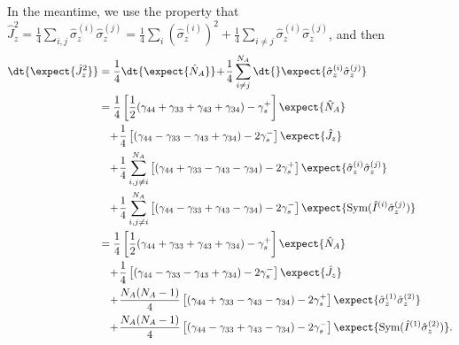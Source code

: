 \documentclass[]{report}
\begin{document}
In the meantime, we use the property that $ \hat{J}_z^2=\frac{1}{4} \sum_{i,j} \hat{\sigma}_z^{(i)}\hat{\sigma}_z^{(j)}=\frac{1}{4} \sum_{i} \left(\hat{\sigma}_z^{(i)}\right)^2 + \frac{1}{4} \sum_{i\neq j} \hat{\sigma}_z^{(i)}\hat{\sigma}_z^{(j)} $, and then 
\begin{align}
\dt{\expect{\hat{J}_z^2}} &=  \frac{1}{4}\dt{\expect{\hat{N}_A}} \!+\! \frac{1}{4}\sum_{i\neq j}^{N_A}\dt{}\expect{\hat{\sigma}_z^{(i)}\hat{\sigma}_z^{(j)}}\\
&= \frac{1}{4}\left[ \frac{1}{2} (\gamma_{44}+\gamma_{33}+\gamma_{43}+\gamma_{34})  -\gamma_s^+\right]\expect{\hat{N}_A} \nonumber\\
&\quad \!+\! \frac{1}{4} \left[  (\gamma_{44}-\gamma_{33}-\gamma_{43}+\gamma_{34})  -2\gamma_s^-\right] \expect{\hat{J}_z} \nonumber\\
&\quad \!+\! \frac{1}{4}\sum_{i,j\neq i}^{N_A} \left[ (\gamma_{44}+\gamma_{33}-\gamma_{43}-\gamma_{34})  -2\gamma_s^+\right]\expect{\hat{\sigma}_z^{(i)} \hat{\sigma}_z^{(j)}} \nonumber\\
&\quad \!+\! \frac{1}{4}\sum_{i,j\neq i}^{N_A} \left[ (\gamma_{44}-\gamma_{33}+\gamma_{43}-\gamma_{34})  -2\gamma_s^-\right]\expect{\mathrm{Sym}(\hat{I}^{(i)}\hat{\sigma}_z^{(j)} ) }\\
&= \frac{1}{4}\left[ \frac{1}{2} (\gamma_{44}+\gamma_{33}+\gamma_{43}+\gamma_{34})  -\gamma_s^+\right]\expect{\hat{N}_A} \nonumber\\
&\quad \!+\! \frac{1}{4} \left[  (\gamma_{44}-\gamma_{33}-\gamma_{43}+\gamma_{34})  -2\gamma_s^-\right] \expect{\hat{J}_z} \nonumber\\
&\quad \!+\! \frac{N_A(N_A-1)}{4} \left[ (\gamma_{44}+\gamma_{33}-\gamma_{43}-\gamma_{34})  -2\gamma_s^+\right]\expect{\hat{\sigma}_z^{(1)} \hat{\sigma}_z^{(2)}} \nonumber\\
&\quad \!+\! \frac{N_A(N_A-1)}{4} \left[ (\gamma_{44}-\gamma_{33}+\gamma_{43}-\gamma_{34})  -2\gamma_s^-\right]\expect{\mathrm{Sym}(\hat{I}^{(1)}\hat{\sigma}_z^{(2)} ) }.\label{eq:expJz2eq}
\end{align}
\end{document}
